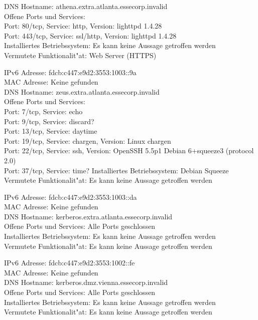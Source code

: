 \documentclass[12pt,a4paper,titlepage,oneside]{scrartcl}
\begin{document}
\begin{description}
DNS Hostname: athena.extra.atlanta.essecorp.invalid\\
Offene Ports und Services:\\
Port: 80/tcp, Service: http, Version: lighttpd 1.4.28\\
Port: 443/tcp, Service: ssl/http, Version: lighttpd 1.4.28\\
Installiertes Betriebssystem: Es kann keine Aussage getroffen werden\\
Vermutete Funktionalit"at: Web Server (HTTPS)\\
\item
IPv6 Adresse: fdcb:c447:e9d2:3553:1003::9a\\
MAC Adresse: Keine gefunden\\
DNS Hostname: zeus.extra.atlanta.essecorp.invalid\\
Offene Ports und Services:\\
Port: 7/tcp, Service: echo\\
Port: 9/tcp, Service: discard?\\
Port: 13/tcp, Service: daytime\\
Port: 19/tcp, Service: chargen, Version: Linux chargen\\
Port: 22/tcp, Service: ssh, Version: OpenSSH 5.5p1 Debian 6+squeeze3 (protocol 2.0)\\
Port: 37/tcp, Service: time?
Installiertes Betriebssystem: Debian Squeeze\\
Vermutete Funktionalit"at: Es kann keine Aussage getroffen werden\\
\item
IPv6 Adresse: fdcb:c447:e9d2:3553:1003::da\\
MAC Adresse: Keine gefunden\\
DNS Hostname: kerberos.extra.atlanta.essecorp.invalid\\
Offene Ports und Services: Alle Ports geschlossen\\
Installiertes Betriebssystem: Es kann keine Aussage getroffen werden\\
Vermutete Funktionalit"at: Es kann keine Aussage getroffen werden\\
\item
IPv6 Adresse: fdcb:c447:e9d2:3553:1002::fe\\
MAC Adresse: Keine gefunden\\
DNS Hostname: kerberos.dmz.vienna.essecorp.invalid\\
Offene Ports und Services: Alle Ports geschlossen\\
Installiertes Betriebssystem: Es kann keine Aussage getroffen werden\\
Vermutete Funktionalit"at: Es kann keine Aussage getroffen werden\\
\end{description}
\end{document}
